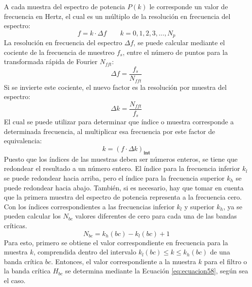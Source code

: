 \begin{enumerate}
\begin{enumerate}
\vskip 0.5cm
A cada muestra del espectro de potencia $P(k)$ le corresponde un valor de frecuencia en Hertz, el cual es un múltiplo de la resolución en frecuencia del espectro:
\begin{equation}
\label{eq:ecuacion58}
f = k \cdot \Delta f
\qquad
k = 0,1,2,3,...,N_{p}
\end{equation}
La resolución en frecuencia del espectro $\Delta f$, se puede calcular mediante el cociente de la frecuencia de muestreo $f_{s}$, entre el número de puntos para la transformada rápida de Fourier $N_{fft}$:
\begin{equation}
\label{eq:ecuacion59}
\Delta f = \frac{f_{s}}{N_{fft}}
\end{equation}
Si se invierte este cociente, el nuevo factor es la resolución por muestra del espectro:
\begin{equation}
\label{eq:ecuacion60}
\Delta k = \frac{N_{fft}}{f_{s}}
\end{equation}
El cual se puede utilizar para determinar que índice o muestra corresponde a determinada frecuencia, al multiplicar esa frecuencia por este factor de equivalencia:
\begin{equation}
\label{eq:ecuacion61}
k = \left ( f \cdot \Delta k  \right )_{\mathbf{int}}
\end{equation}
Puesto que los índices de las muestras deben ser números enteros, se tiene que redondear el resultado a un número entero. El índice para la frecuencia inferior $k_{l}$ se puede redondear hacia arriba, pero el índice para la frecuencia superior $k_{h}$ se puede redondear hacia abajo. También, si es necesario, hay que tomar en cuenta que la primera muestra del espectro de potencia representa a la frecuencia cero.
\vskip 0.5cm
Con los índices correspondientes a las frecuencias inferior $k_{l}$ y superior $k_{h}$, ya se pueden calcular los $N_{bc}$ valores diferentes de cero para cada una de las bandas críticas.
\begin{equation}
\label{eq:ecuacion62}
N_{bc} = k_{h}(bc) - k_{l}(bc) + 1
\end{equation}
Para esto, primero se obtiene el valor correspondiente en frecuencia para la muestra $k$, comprendida dentro del intervalo $k_{l}(bc) \leq k \leq k_{h}(bc)$ de una banda crítica $bc$. Entonces, el valor correspondiente a la muestra $k$ para el filtro o la banda crítica $H_{bc}$ se determina mediante la Ecuación \eqref{eq:ecuacion58}, según sea el caso.


\end{enumerate}
\end{enumerate}
